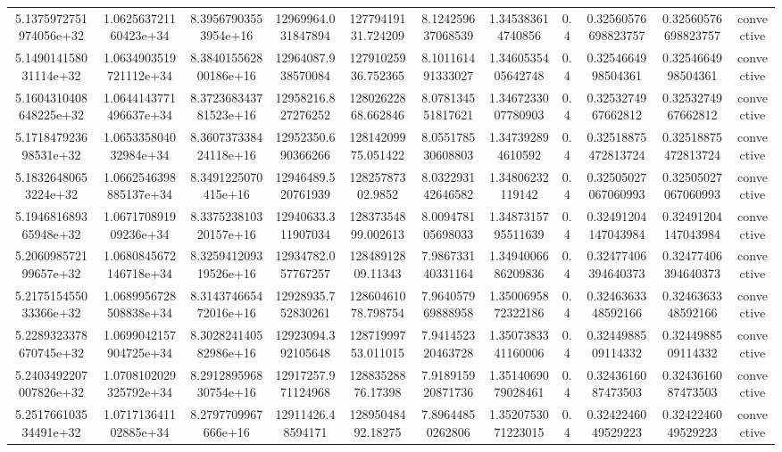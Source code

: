 \begin{table}
\begin{tabular}{ccccccccccc}
5.1375972751974056e+32 & 1.062563721160423e+34 & 8.39567903553954e+16 & 12969964.031847894 & 12779419131.724209 & 8.124259637068539 & 1.345383614740856 & 0.4 & 0.32560576698823757 & 0.32560576698823757 & convective \\
5.149014158031114e+32 & 1.0634903519721112e+34 & 8.384015562800186e+16 & 12964087.938570084 & 12791025936.752365 & 8.101161491333027 & 1.3460535405642748 & 0.4 & 0.3254664998504361 & 0.3254664998504361 & convective \\
5.1604310408648225e+32 & 1.0644143771496637e+34 & 8.372368343781523e+16 & 12958216.827276252 & 12802622868.662846 & 8.078134551817621 & 1.3467233007780903 & 0.4 & 0.3253274967662812 & 0.3253274967662812 & convective \\
5.171847923698531e+32 & 1.065335804032984e+34 & 8.360737338424118e+16 & 12952350.690366266 & 12814209975.051422 & 8.055178530608803 & 1.347392894610592 & 0.4 & 0.32518875472813724 & 0.32518875472813724 & convective \\
5.18326480653224e+32 & 1.0662546398885137e+34 & 8.3491225070415e+16 & 12946489.520761939 & 12825787302.9852 & 8.032293142646582 & 1.34806232119142 & 0.4 & 0.32505027067060993 & 0.32505027067060993 & convective \\
5.194681689365948e+32 & 1.067170891909236e+34 & 8.337523810320157e+16 & 12940633.311907034 & 12837354899.002613 & 8.009478105698033 & 1.3487315795511639 & 0.4 & 0.32491204147043984 & 0.32491204147043984 & convective \\
5.206098572199657e+32 & 1.0680845672146718e+34 & 8.325941209319526e+16 & 12934782.057767257 & 12848912809.11343 & 7.986733140331164 & 1.3494006686209836 & 0.4 & 0.32477406394640373 & 0.32477406394640373 & convective \\
5.217515455033366e+32 & 1.0689956728508838e+34 & 8.314374665472016e+16 & 12928935.752830261 & 12860461078.798754 & 7.964057969888958 & 1.3500695872322186 & 0.4 & 0.3246363348592166 & 0.3246363348592166 & convective \\
5.2289323378670745e+32 & 1.0699042157904725e+34 & 8.302824140582986e+16 & 12923094.392105648 & 12871999753.011015 & 7.941452320463728 & 1.3507383341160006 & 0.4 & 0.3244988509114332 & 0.3244988509114332 & convective \\
5.2403492207007826e+32 & 1.0708102029325792e+34 & 8.291289596830754e+16 & 12917257.971124968 & 12883528876.17398 & 7.918915920871736 & 1.3514069079028461 & 0.4 & 0.3243616087473503 & 0.3243616087473503 & convective \\
5.251766103534491e+32 & 1.071713641102885e+34 & 8.2797709967666e+16 & 12911426.48594171 & 12895048492.18275 & 7.89644850262806 & 1.3520753071223015 & 0.4 & 0.3242246049529223 & 0.3242246049529223 & convective \\

\end{tabular}
\end{table}
